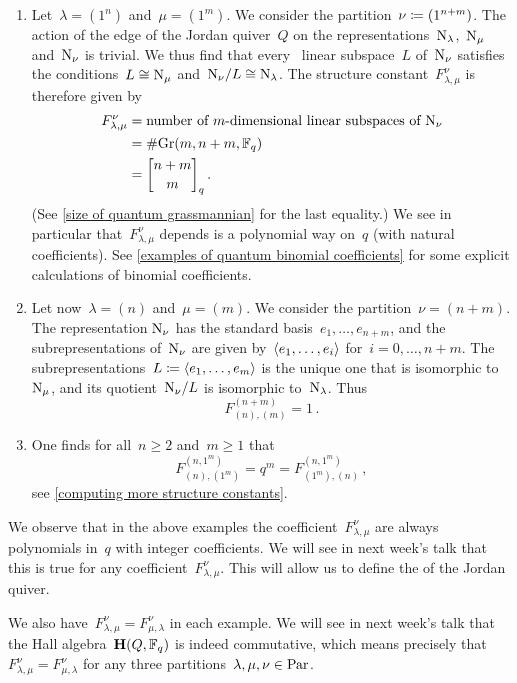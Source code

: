 \documentclass[a4paper,11pt]{scrartcl}
\begin{document}
\begin{example}
  \leavevmode
  \begin{enumerate}
    \item
      Let~$\lambda = (1^n)$ and~$\mu = (1^m)$.
      We consider the partition~$\nu \coloneqq (1^{n+m})$.
      The action of the edge of the Jordan quiver~$Q$ on the representations~$\mathrm{N}_\lambda$,~$\mathrm{N}_\mu$ and~$\mathrm{N}_\nu$ is trivial.
      We thus find that every~ linear subspace~$L$ of~$\mathrm{N}_{\nu}$ satisfies the conditions~$L \cong \mathrm{N}_\mu$ and~$\mathrm{N}_\nu / L \cong \mathrm{N}_\lambda$.
      The structure constant~$F^{\nu}_{\lambda, \mu}$ is therefore given by
      \begin{align*}
        F^{\nu}_{\lambda, \mu}
        &=
        \text{number of~\dimensional{$m$} linear subspaces of~$\Nil_{\nu}$}
        \\
        &=
        \counting {\Gr(m, n+m, \Finite_q)}
        \\
        &=
        \qbinom{n+m}{m}_q \,.
      \end{align*}
      (See \cref{size of quantum grassmannian} for the last equality.)
      We see in particular that~$F^{\nu}_{\lambda, \mu}$ depends is a polynomial way on~$q$ (with natural coefficients). 
      See \cref{examples of quantum binomial coefficients} for some explicit calculations of binomial coefficients.
    \item
      Let now~$\lambda = (n)$ and~$\mu = (m)$.
      We consider the partition~$\nu = (n+m)$. 
      The representation$~\mathrm{N}_{\nu}$ has the standard basis~$e_1, \dotsc, e_{n+m}$, and the subrepresentations of~$\mathrm{N}_{\nu}$ are given by~$\langle e_1, \dotsc, e_i\rangle$ for~$i = 0, \dotsc, n+m$.
      The subrepresentations~$L \coloneqq \langle e_1, \dotsc, e_m\rangle$ is the unique one that is isomorphic to~$\mathrm{N}_\mu$, and its quotient~$\mathrm{N}_\nu / L$ is isomorphic to~$\mathrm{N}_\lambda$.
      Thus
      \[
        F^{(n+m)}_{(n),(m)}
        =
        1 \,.
      \]
    \item
      One finds for all~$n \geq 2$ and~$m \geq 1$ that
      \[
        F^{(n, 1^m)}_{(n), (1^m)}
        =
        q^m
        =
        F^{(n, 1^m)}_{(1^m), (n)} \,,
      \]
      see \cref{computing more structure constants}.
  \end{enumerate}
  We observe that in the above examples the coefficient~$F^{\nu}_{\lambda, \mu}$ are always polynomials in~$q$ with integer coefficients.
  We will see in next week’s talk that this is true for any coefficient~$F^{\nu}_{\lambda, \mu}$.
  This will allow us to define the  of the Jordan quiver.

  We also have~$F^{\nu}_{\lambda, \mu} = F^{\nu}_{\mu, \lambda}$ in each example.
  We will see in next week’s talk that the Hall algebra~$\mathbf{H}(Q, \mathbb{F}_q)$ is indeed commutative, which means precisely that~$F^\nu_{\lambda, \mu} = F^\nu_{\mu, \lambda}$ for any three partitions~$\lambda, \mu, \nu \in \mathrm{Par}$.
\end{example}
\end{document}

